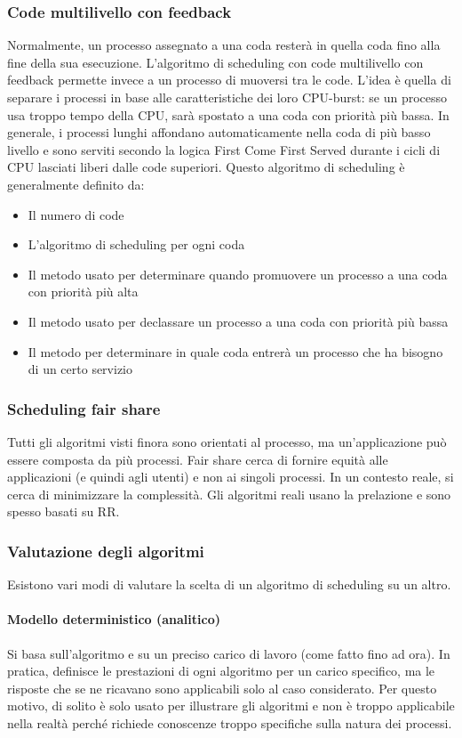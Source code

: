 \documentclass[a4paper]{article}
\begin{document}
\subsubsection{Code multilivello con feedback}
Normalmente, un processo assegnato a una coda resterà in quella coda fino alla fine della sua esecuzione. L'algoritmo di scheduling con code multilivello con feedback permette invece a un processo di muoversi tra le code. L'idea è quella di separare i processi in base alle caratteristiche dei loro CPU-burst: se un processo usa troppo tempo della CPU, sarà spostato a una coda con priorità più bassa. \newline
In generale, i processi lunghi affondano automaticamente nella coda di più basso livello e sono serviti secondo la logica First Come First Served durante i cicli di CPU lasciati liberi dalle code superiori. \newline
Questo algoritmo di scheduling è generalmente definito da:
\begin{itemize}
   \item Il numero di code
   \item L'algoritmo di scheduling per ogni coda
   \item Il metodo usato per determinare quando promuovere un processo a una coda con priorità più alta
   \item Il metodo usato per declassare un processo a una coda con priorità più bassa
   \item Il metodo per determinare in quale coda entrerà un processo che ha bisogno di un certo servizio
\end{itemize}

\subsubsection{Scheduling fair share}
Tutti gli algoritmi visti finora sono orientati al processo, ma un'applicazione può essere composta da più processi. Fair share cerca di fornire equità alle applicazioni (e quindi agli utenti) e non ai singoli processi.
In un contesto reale, si cerca di minimizzare la complessità. Gli algoritmi reali usano la prelazione e sono spesso basati su RR.

\subsubsection{Valutazione degli algoritmi}
Esistono vari modi di valutare la scelta di un algoritmo di scheduling su un altro.
\paragraph{Modello deterministico (analitico)} Si basa sull'algoritmo e su un preciso carico di lavoro (come fatto fino ad ora). In pratica, definisce le prestazioni di ogni algoritmo per un carico specifico, ma le risposte che se ne ricavano sono applicabili solo al caso considerato. Per questo motivo, di solito è solo usato per illustrare gli algoritmi e non è troppo applicabile nella realtà perché richiede conoscenze troppo specifiche sulla natura dei processi.
\end{document}
